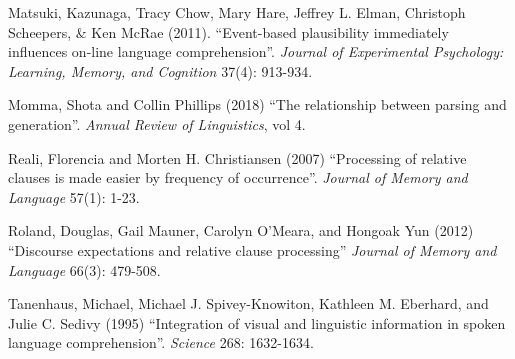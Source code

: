 \documentclass[a4paper]{article}
\begin{document}
Matsuki, Kazunaga, Tracy Chow, Mary Hare, Jeffrey L. Elman, Christoph Scheepers, \& Ken McRae (2011). ``Event-based plausibility immediately influences on-line language comprehension''. \emph{Journal of Experimental Psychology: Learning, Memory, and Cognition} 37(4): 913-934.

Momma, Shota and Collin Phillips (2018) ``The relationship between parsing and generation''. \emph{Annual Review of Linguistics}, vol 4.

Reali, Florencia and Morten H. Christiansen (2007) ``Processing of relative clauses is made easier by frequency of occurrence''.  \emph{Journal of Memory and Language} 57(1): 1-23.

Roland, Douglas, Gail Mauner, Carolyn O'Meara, and Hongoak Yun (2012) ``Discourse expectations and relative clause processing''  \emph{Journal of Memory and Language} 66(3): 479-508.

Tanenhaus, Michael, Michael J. Spivey-Knowiton, Kathleen M. Eberhard, and Julie C. Sedivy (1995) ``Integration of visual and linguistic information in spoken language comprehension''. \emph{Science} 268: 1632-1634.




{\sloppy
\printbibliography[heading=subbibliography,notkeyword=this] 
}
\end{document}
